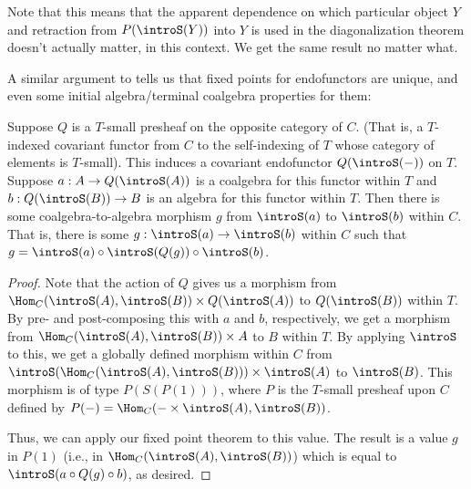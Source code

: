 
\begin{observation}
Note that this means that the apparent dependence on which particular object $Y$ and retraction from $P(\introS(Y))$ into $Y$ is used in the diagonalization theorem doesn't actually matter, in this context. We get the same result no matter what.
\end{observation}

A similar argument to  tells us that fixed points for endofunctors are unique, and even some initial algebra/terminal coalgebra properties for them:

\begin{theorem}\label{CoalgToAlgExist}
Suppose $Q$ is a $T$-small presheaf on the opposite category of $C$. (That is, a $T$-indexed covariant functor from $C$ to the self-indexing of $T$ whose category of elements is $T$-small). This induces a covariant endofunctor $Q(\introS(-))$ on $T$. Suppose $a : A \to Q(\introS(A))$ is a coalgebra for this functor within $T$ and $b : Q(\introS(B)) \to B$ is an algebra for this functor within $T$. Then there is some coalgebra-to-algebra morphism $g$ from $\introS(a)$ to $\introS(b)$ within $C$. That is, there is some $g : \introS(a) \to \introS(b)$ within $C$ such that $g = \introS(a) \circ \introS(Q(g)) \circ \introS(b)$.
\end{theorem}
\begin{proof}
Note that the action of $Q$ gives us a morphism from $\Hom_C(\introS(A), \introS(B)) \times Q(\introS(A))$ to $Q(\introS(B))$ within $T$. By pre- and post-composing this with $a$ and $b$, respectively, we get a morphism from $\Hom_C(\introS(A), \introS(B)) \times A$ to $B$ within $T$. By applying $\introS$ to this, we get a globally defined morphism within $C$ from $\introS(\Hom_C(\introS(A), \introS(B))) \times \introS(A)$ to $\introS(B)$. This morphism is of type $P(S(P(1)))$, where $P$ is the $T$-small presheaf upon $C$ defined by $P(-) = \Hom_C(- \times \introS(A), \introS(B))$.

Thus, we can apply our fixed point theorem  to this value. The result is a value $g$ in $P(1)$ (i.e., in $\Hom_C(\introS(A), \introS(B))$) which is equal to $\introS(a \circ Q(g) \circ b)$, as desired.

\end{proof}

